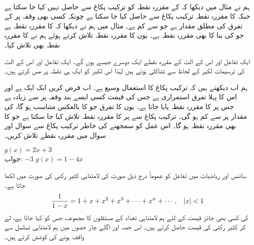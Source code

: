 \\
ہم نے مثال  میں دیکھا کہ  کے مقررہ نقطہ کو ترکیب پکاغ سے حاصل نہیں کیا جا سکتا ہے جبکہ   کا مقررہ نقطہ ترکیب پکاغ سے حاصل کیا جا سکتا ہے چونکہ کسی بھی وقفہ پر  کے تفرق  کی مطلق مقدار  ہے جو  سے کم ہے۔ مثال  میں ہم نے دیکھا کہ  کا مقررہ نقطہ  ہے  جو  کی بنا  کا بھی مقررہ نقطہ ہے۔ یوں  کا مقررہ نقطہ تلاش کرتے ہوئے ہم نے  کا مقررہ نقطہ بھی تلاش کیا۔

ایک تفاعل اور اس کے الٹ کے مقررہ نقطے ایک دوسرے جیسے ہوں گے۔ ایک تفاعل اور اس کے الٹ کی ترسیمات لکیر  کے لحاظ سے تشاکلی ہوتے ہیں لہٰذا اس لکیر کو ایک ہی نقطہ پر مس کرتے ہیں۔

ہم اب دیکھتے ہیں کہ ترکیب پکاغ کا استعمال وسیع ہے۔ اب فرض کریں  ایک ایک ہے اور اس کا پہلا تفرق استمراری ہے جس کی قیمت کسی ایسے بند وقفہ  پر  سے زیادہ ہے جس پر  کا مقررہ نقطہ پایا جاتا ہے۔ یوں  کا تفرق جو  کا بالعکس متناسب ہو گا، کی مقدار  پر  سے کم ہو گی۔ ترکیب پکاغ سے  پر  کا مقررہ نقطہ تلاش کیا جا سکتا ہے جو  کا بھی مقررہ نقطہ ہو گا۔ اس عمل کو سمجھنے کی خاطر ترکیب پکاغ سے سوال  اور سوال  میں مقررہ نقطے تلاش کریں۔

$g(x)=2x+3$\\
جواب:\quad
$-3$
$g(x)=1-4x$

سائنس اور ریاضیات میں تفاعل کو عموماً درج ذیل صورت کی لامتناہی کثیر رکنی کی صورت میں لکھا جاتا ہے۔
\begin{align*}
\frac{1}{1-x}=1+x+x^2+x^3+\cdots+x^n+\cdots,\quad \abs{x}<1
\end{align*}
 کی کسی بھی جائز قیمت کے لئے ہم  لامتناہی تعداد کے مستقلوں کا مجموعہ، جس کو  کہا جاتا ہے، لے کر کثیر رکنی کی قیمت حاصل کرتے ہیں۔  اس حصہ اور اگلے چار حصوں میں ہم لامتناہی تسلسل سے واقف ہونے کی کوشش کرتے ہیں۔

